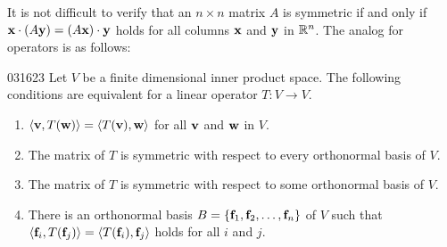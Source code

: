 It is not difficult to verify that an $n \times n$ matrix $A$ is symmetric if and only if $\textbf{x} \cdot (A\textbf{y}) = (A\textbf{x}) \cdot \textbf{y}$ holds for all columns $\textbf{x}$ and $\textbf{y}$ in $\mathbb{R}^n$. The analog for operators is as follows:

\begin{theorem}{}{031623}
Let $V$ be a finite dimensional inner product space. The following conditions are equivalent for a linear operator $T : V \to V$.

\begin{enumerate}
\item $\langle\textbf{v}, T(\textbf{w})\rangle = \langle T(\textbf{v}), \textbf{w}\rangle$ for all $\textbf{v}$ and $\textbf{w}$ in $V$.

\item The matrix of $T$ is symmetric with respect to every orthonormal basis of $V$.

\item The matrix of $T$ is symmetric with respect to some orthonormal basis of $V$.

\item There is an orthonormal basis $B = \{\textbf{f}_{1}, \textbf{f}_{2}, \dots, \textbf{f}_{n}\}$ of $V$ such that $\langle \textbf{f}_i, T(\textbf{f}_j) \rangle = \langle T(\textbf{f}_i), \textbf{f}_j \rangle$ holds for all $i$ and $j$.

\end{enumerate}
\end{theorem}

